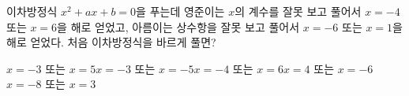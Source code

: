 이차방정식 $x^2+ax+b=0$을 푸는데 영준이는 $x$의 계수를 잘못 보고 풀어서 $x=-4$ 또는 $x=6$을 해로 얻었고, 아름이는 상수항을 잘못 보고 풀어서 $x=-6$ 또는 $x=1$을 해로 얻었다. 처음 이차방정식을 바르게 풀면? 
\begin{choicesii}{$x=-3$ 또는 $x=5$}{$x=-3$ 또는 $x=-5$}{$x=-4$ 또는 $x=6$}{$x=4$ 또는 $x=-6$}{$x=-8$ 또는 $x=3$}\end{choicesii}
